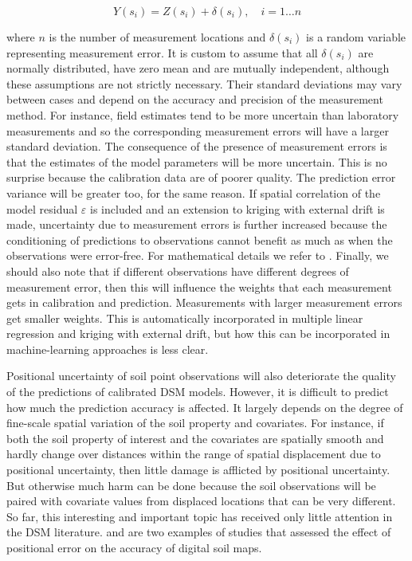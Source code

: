 \documentclass[10pt,b5paper,]{book}
\theoremstyle{definition}
\theoremstyle{definition}
\theoremstyle{definition}
\theoremstyle{remark}
\begin{document}
\begin{equation}
Y(s_i) = Z(s_i) + \delta(s_i), \quad i = 1 \dots n
\end{equation}

where \(n\) is the number of measurement locations and \({\delta(s_i)}\)
is a random variable representing measurement error. It is custom to
assume that all \({\delta(s_i)}\) are normally distributed, have zero
mean and are mutually independent, although these assumptions are not
strictly necessary. Their standard deviations may vary between cases and
depend on the accuracy and precision of the measurement method. For
instance, field estimates tend to be more uncertain than laboratory
measurements and so the corresponding measurement errors will have a
larger standard deviation. The consequence of the presence of
measurement errors is that the estimates of the model parameters will be
more uncertain. This is no surprise because the calibration data are of
poorer quality. The prediction error variance will be greater too, for
the same reason. If spatial correlation of the model residual
\({\varepsilon}\) is included and an extension to kriging with external
drift is made, uncertainty due to measurement errors is further
increased because the conditioning of predictions to observations cannot
benefit as much as when the observations were error-free. For
mathematical details we refer to \cite{cressie1993statistics}. Finally,
we should also note that if different observations have different
degrees of measurement error, then this will influence the weights that
each measurement gets in calibration and prediction. Measurements with
larger measurement errors get smaller weights. This is automatically
incorporated in multiple linear regression and kriging with external
drift, but how this can be incorporated in machine-learning approaches
is less clear.

Positional uncertainty of soil point observations will also deteriorate
the quality of the predictions of calibrated DSM models. However, it is
difficult to predict how much the prediction accuracy is affected. It
largely depends on the degree of fine-scale spatial variation of the
soil property and covariates. For instance, if both the soil property of
interest and the covariates are spatially smooth and hardly change over
distances within the range of spatial displacement due to positional
uncertainty, then little damage is afflicted by positional uncertainty.
But otherwise much harm can be done because the soil observations will
be paired with covariate values from displaced locations that can be
very different. So far, this interesting and important topic has
received only little attention in the DSM literature.
\cite{grimm2010uncertainty} and \cite{nelson2011error} are two examples
of studies that assessed the effect of positional error on the accuracy
of digital soil maps.
\end{document}
